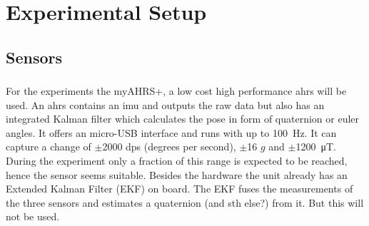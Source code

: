 \chapter{Experimental Setup}
\label{ch:ExperimentalSetup}

\section{Sensors}
\subsection{}
For the experiments the myAHRS+, a low cost high performance \gls{ahrs} will be used.
An \gls{ahrs} contains an \gls{imu} and outputs the raw data but also has an integrated Kalman filter which calculates the pose in form of quaternion or euler angles.
It offers an micro-USB interface and runs with up to \SI{100}{\Hz}.
It can capture a change of $\pm$2000 dps (degrees per second), $\pm$16 $g$ and $\pm$\SI{1200}{\micro\tesla}.
During the experiment only a fraction of this range is expected to be reached, hence the sensor seems suitable.
Besides the hardware the unit already has an Extended Kalman Filter (EKF) on board.
The EKF fuses the measurements of the three sensors and estimates a quaternion (and sth else?) from it.
But this will not be used.


